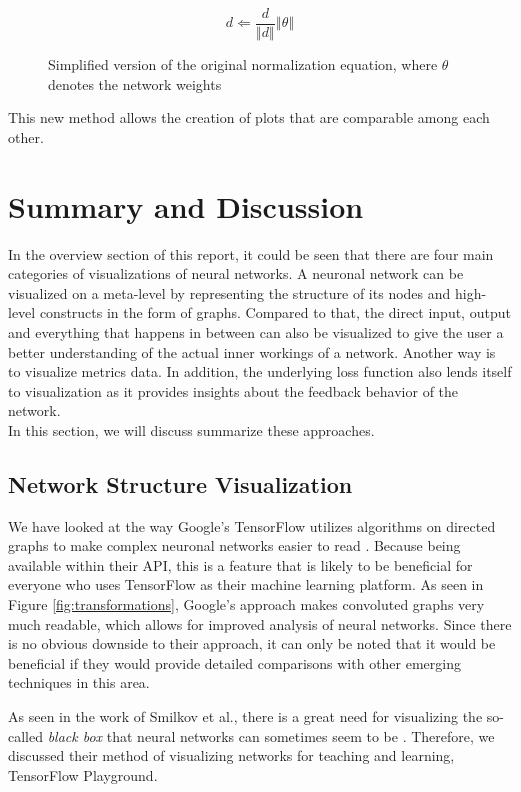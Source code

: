 \documentclass{acmsiggraph}               %
\begin{document}
\begin{figure}
\begin{equation}
  d \Leftarrow \frac{d}{\left\Vert d \right\Vert} \left\Vert\theta\right\Vert
\end{equation}
\caption{Simplified version of the original normalization equation, where $\theta$ denotes the network weights \protect\cite{Li2017}}
\end{figure}

This new method allows the creation of plots that are comparable among each other.

\section{Summary and Discussion}
In the overview section of this report, it could be seen that there are four main categories of visualizations of neural networks. A neuronal network can be visualized on a meta-level by representing the structure of its nodes and high-level constructs in the form of graphs. Compared to that, the direct input, output and everything that happens in between can also be visualized to give the user a better understanding of the actual inner workings of a network. Another way is to visualize metrics data. In addition, the underlying loss function also lends itself to visualization as it provides insights about the feedback behavior of the network.\\
In this section, we will discuss summarize these approaches.\\

\subsection{Network Structure Visualization}

We have looked at the way Google's TensorFlow utilizes algorithms on directed graphs to make complex neuronal networks easier to read \cite{Wongsuphasawat2018}. Because being available within their API, this is a feature that is likely to be beneficial for everyone who uses TensorFlow as their machine learning platform. As seen in Figure \ref{fig:transformations}, Google's approach makes convoluted graphs very much readable, which allows for improved analysis of neural networks. Since there is no obvious downside to their approach, it can only be noted that it would be beneficial if they would provide detailed comparisons with other emerging techniques in this area.

As seen in the work of Smilkov et al., there is a great need for visualizing the so-called \textit{black box} that neural networks can sometimes seem to be \cite{Smilkov2017}. Therefore, we discussed their method of visualizing networks for teaching and learning, TensorFlow Playground.
\end{document}
